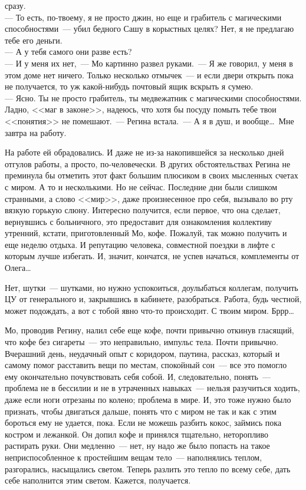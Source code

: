 сразу.\\
--- То есть, по-твоему, я не просто джин, но еще и грабитель с магическими 
способностями~--- убил бедного Сашу в корыстных целях? Нет, я не предлагаю тебе 
его деньги.\\
--- А у тебя самого они разве есть?\\
--- И у меня их нет,~--- Мо картинно развел руками.~--- Я же говорил, у меня в 
этом 
доме нет ничего. Только несколько отмычек~--- и если двери открыть пока не 
получается, то уж какой-нибудь почтовый ящик вскрыть я сумею.\\
--- Ясно. Ты не просто грабитель, ты медвежатник с магическими способностями. 
Ладно, <<маг в законе>>, надеюсь, что хотя бы посуду помыть тебе твои 
<<понятия>> не 
помешают.~--- Регина встала.~--- А я в душ, и вообще\ldots\ Мне завтра на 
работу.

На работе ей обрадовались. И даже не из-за накопившейся за несколько дней 
отгулов работы, а просто, по-человечески. В других обстоятельствах Регина не 
преминула бы отметить этот факт большим плюсиком в своих мысленных счетах с 
миром. А то и несколькими. Но не сейчас. Последние дни были слишком странными, 
а 
слово <<мир>>, даже произнесенное про себя, вызывало во рту вязкую горькую 
слюну. 
Интересно получится, если первое, что она сделает, вернувшись с больничного, 
это 
предоставит для ознакомления коллективу утренний, кстати, приготовленный Мо, 
кофе. Пожалуй, так можно получить и еще неделю отдыха. И репутацию человека, 
совместной поездки в лифте с которым лучше избегать. И, значит, кончатся, не 
успев начаться, комплементы от Олега\ldots

Нет, шутки~--- шутками, но нужно успокоиться, доулыбаться коллегам, получить ЦУ 
от 
генерального и, закрывшись в кабинете, разобраться. Работа, будь честной, может 
подождать, а вот с тобой явно что-то происходит. С твоим миром. Бррр\ldots 

Мо, проводив Регину, налил себе еще кофе, почти привычно откинув гласящий, что 
кофе без сигареты~--- это неправильно, импульс тела. Почти привычно. Вчерашний 
день, неудачный опыт с коридором, паутина, рассказ, который и самому помог 
расставить вещи по местам, спокойный сон~--- все это помогло ему окончательно 
почувствовать себя собой. И, следовательно, понять~--- проблема не в бессилии и 
не 
в утраченных навыках~--- нельзя разучиться ходить, даже если ноги отрезаны по 
колено; проблема в мире. И, это тоже нужно было признать, чтобы двигаться 
дальше, понять что с миром не так и как с этим бороться ему не удается, пока. 
Если не можешь разбить кокос, займись пока костром и лежанкой. Он допил кофе и 
принялся тщательно, неторопливо растирать руки. Они медленно~--- нет, ну надо 
же 
было попасть на такое неприспособленное к простейшим вещам тело~--- наполнялись 
теплом, разгорались, насыщались светом. Теперь разлить это тепло по всему себе, 
дать себе наполнится этим светом. Кажется, получается.

